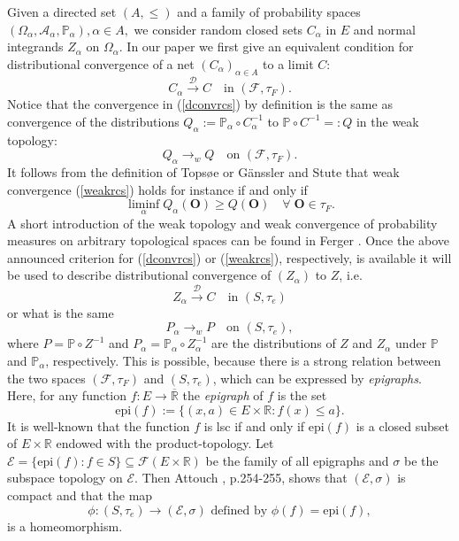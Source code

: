 \documentclass[sn-mathphys,Numbered]{sn-jnl}%
\theoremstyle{thmstyleone}%
\theoremstyle{thmstyletwo}%
\theoremstyle{thmstylethree}%
\begin{document}
Given a directed set $(A, \le)$ and a family of probability spaces $(\Omega_\alpha, \mathcal{A}_\alpha,\mathbb{P}_\alpha), \alpha \in A,$ we consider
random closed sets $C_\alpha$ in $E$ and normal integrands $Z_\alpha$ on $\Omega_\alpha$. In our paper we first give an equivalent condition for
distributional convergence of a net $(C_\alpha)_{\alpha \in A}$ to a limit $C$:
\begin{equation} \label{dconvrcs}
 C_\alpha \stackrel{\mathcal{D}}{\longrightarrow} C \quad \text{in } (\mathcal{F},\tau_F).
\end{equation}
Notice that the convergence in (\ref{dconvrcs}) by definition is the same as convergence of the
distributions $Q_\alpha := \mathbb{P}_\alpha \circ C_\alpha^{-1}$ to $\mathbb{P} \circ C^{-1} =: Q$ in the weak topology:
\begin{equation} \label{weakrcs}
 Q_\alpha \longrightarrow_w Q \quad \text{on } (\mathcal{F},\tau_F).
\end{equation}
It follows from the definition of Tops{\o}e \cite{Top} or G\"{a}nssler and Stute \cite{Stute} that weak convergence (\ref{weakrcs}) holds for instance if and only if
$$
 \liminf_\alpha Q_\alpha(\textbf{O}) \ge Q(\textbf{O}) \quad \forall \; \textbf{O} \in \tau_F.
$$
A short introduction of the weak topology and weak convergence of probability measures on arbitrary topological spaces can be found in Ferger \cite{Ferger2}.
Once the above announced criterion for (\ref{dconvrcs}) or (\ref{weakrcs}), respectively, is available it will be used to describe
distributional convergence of $(Z_\alpha)$ to $Z$, i.e.
$$
 Z_\alpha \stackrel{\mathcal{D}}{\longrightarrow} C \quad \text{in } (S,\tau_e)
$$
or what is the same
$$
  P_\alpha \longrightarrow_w P \quad \text{on } (S,\tau_e),
$$
where $P=\mathbb{P}\circ Z^{-1}$ and $P_\alpha=\mathbb{P}_\alpha \circ Z_\alpha^{-1}$ are the distributions of $Z$ and $Z_\alpha$ under $\mathbb{P}$ and $\mathbb{P}_\alpha$, respectively. This is possible, because
there is a strong relation between the two spaces $(\mathcal{F},\tau_F)$ and $(S,\tau_e)$, which can be expressed by \emph{epigraphs}. Here, for any
function $f:E \rightarrow \overline{\mathbb{R}}$ the \emph{epigraph} of $f$ is the set
$$
 \text{epi}(f):=\{(x,a) \in E \times \mathbb{R}: f(x) \le a \}.
$$
It is well-known that the function $f$ is lsc if and only if epi$(f)$ is a closed subset of $E \times \mathbb{R}$ endowed with the product-topology.
Let $\mathcal{E}=\{\text{epi}(f): f \in S\} \subseteq \mathcal{F}(E \times \mathbb{R})$ be the family of all epigraphs and $\sigma$ be the subspace topology on $\mathcal{E}$. Then Attouch \cite{Attouch}, p.254-255, shows that $(\mathcal{E},\sigma)$ is compact and that    the map
\begin{equation} \label{phi}
\phi:(S,\tau_e) \rightarrow (\mathcal{E},\sigma) \text{ defined by } \phi(f)=\text{epi}(f),
\end{equation}
is a homeomorphism.\\
\end{document}
